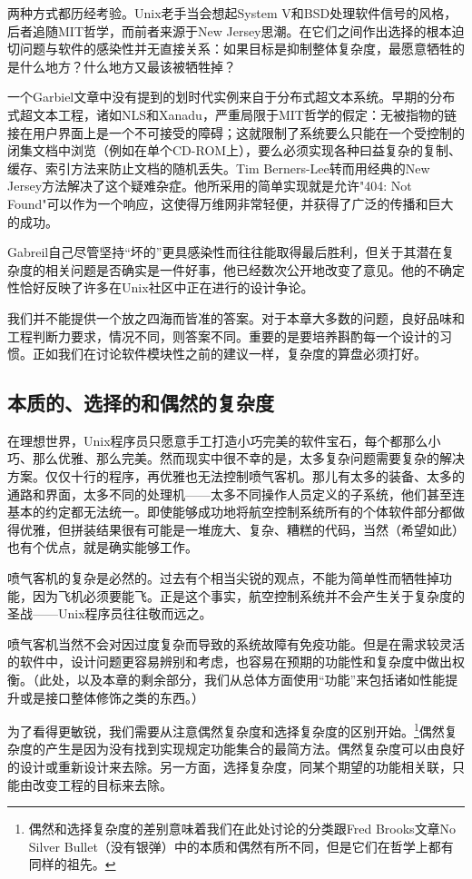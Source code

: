 \documentclass[12pt,oneside]{book}
\begin{document}
\begin{common-format}
两种方式都历经考验。Unix老手当会想起System V和BSD处理软件信号的风格，后者追随MIT哲学，而前者来源于New Jersey思潮。在它们之间作出选择的根本迫切问题与软件的感染性并无直接关系：如果目标是抑制整体复杂度，最愿意牺牲的是什么地方？什么地方又最该被牺牲掉？

一个Garbiel文章中没有提到的划时代实例来自于分布式超文本系统。早期的分布式超文本工程，诸如NLS和Xanadu，严重局限于MIT哲学的假定：无被指物的链接在用户界面上是一个不可接受的障碍；这就限制了系统要么只能在一个受控制的闭集文档中浏览（例如在单个CD-ROM上），要么必须实现各种曰益复杂的复制、缓存、索引方法来防止文档的随机丢失。Tim Berners-Lee转而用经典的New Jersey方法解决了这个疑难杂症。他所采用的简单实现就是允许"404: Not Found"可以作为一个响应，这使得万维网非常轻便，并获得了广泛的传播和巨大的成功。

Gabreil自己尽管坚持“坏的”更具感染性而往往能取得最后胜利，但关于其潜在复杂度的相关问题是否确实是一件好事，他已经数次公开地改变了意见。他的不确定性恰好反映了许多在Unix社区中正在进行的设计争论。

我们并不能提供一个放之四海而皆准的答案。对于本章大多数的问题，良好品味和工程判断力要求，情况不同，则答案不同。重要的是要培养斟酌每一个设计的习惯。正如我们在讨论软件模块性之前的建议一样，复杂度的算盘必须打好。

\subsection{本质的、选择的和偶然的复杂度}
在理想世界，Unix程序员只愿意手工打造小巧完美的软件宝石，每个都那么小巧、那么优雅、那么完美。然而现实中很不幸的是，太多复杂问题需要复杂的解决方案。仅仅十行的程序，再优雅也无法控制喷气客机。那儿有太多的装备、太多的通路和界面，太多不同的处理机——太多不同操作人员定义的子系统，他们甚至连基本的约定都无法统一。即使能够成功地将航空控制系统所有的个体软件部分都做得优雅，但拼装结果很有可能是一堆庞大、复杂、糟糕的代码，当然（希望如此）也有个优点，就是确实能够工作。

喷气客机的复杂是必然的。过去有个相当尖锐的观点，不能为简单性而牺牲掉功能，因为飞机必须要能飞。正是这个事实，航空控制系统并不会产生关于复杂度的圣战——Unix程序员往往敬而远之。

喷气客机当然不会对因过度复杂而导致的系统故障有免疫功能。但是在需求较灵活的软件中，设计问题更容易辨别和考虑，也容易在预期的功能性和复杂度中做出权衡。（此处，以及本章的剩余部分，我们从总体方面使用“功能”来包括诸如性能提升或是接口整体修饰之类的东西。）

为了看得更敏锐，我们需要从注意偶然复杂度和选择复杂度的区别开始。\footnote{偶然和选择复杂度的差别意味着我们在此处讨论的分类跟Fred Brooks文章No Silver Bullet（没有银弹）\cite{Brooks}中的本质和偶然有所不同，但是它们在哲学上都有同样的祖先。}偶然复杂度的产生是因为没有找到实现规定功能集合的最简方法。偶然复杂度可以由良好的设计或重新设计来去除。另一方面，选择复杂度，同某个期望的功能相关联，只能由改变工程的目标来去除。


\end{common-format}
\end{document}
